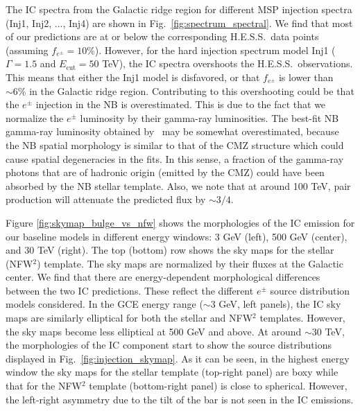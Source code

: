 \documentclass[doublespace,nopageskip]{VTthesis}
\begin{document}
The IC spectra from the Galactic ridge region for different MSP injection spectra (Inj1, Inj2, ..., Inj4) are shown in Fig.~\ref{fig:spectrum_spectral}. We find that most of our predictions are at or below the corresponding H.E.S.S.~data points (assuming $f_{e^\pm} = 10\%$). However, for the hard injection spectrum model Inj1 ($\Gamma = 1.5$ and $E_{\text{cut}}=50$ TeV), the IC spectra overshoots the H.E.S.S.~observations. This means that either the Inj1 model is disfavored, or that $f_{e^\pm}$ is lower than $\sim 6\%$ in the Galactic ridge region. Contributing to this overshooting could be that the $e^\pm$ injection in the NB is overestimated. This is due to the fact that we normalize the $e^\pm$ luminosity by their gamma-ray luminosities. The best-fit NB gamma-ray luminosity obtained by~\citet{2018NatAs...2..387M} may be somewhat overestimated, because the NB spatial morphology is similar to that of the CMZ structure which could cause spatial degeneracies in the fits. In this sense, a fraction of the gamma-ray photons that are of hadronic origin (emitted by the CMZ) could have been absorbed by the NB stellar template. Also, we note that at around 100 TeV, pair production will attenuate the predicted flux by $\sim 3/4$.

Figure \ref{fig:skymap_bulge_vs_nfw} shows the morphologies of the IC emission for our baseline models in different energy windows: 3 GeV (left), 500 GeV (center), and 30 TeV (right). The top (bottom) row shows the sky maps for the stellar (NFW$^2$) template. The sky maps are normalized by their fluxes at the Galactic center. We find that there are energy-dependent morphological differences between the two IC predictions. These reflect the different $e^\pm$ source distribution models considered. In the GCE energy range ($\sim 3$ GeV, left panels), the IC sky maps are similarly elliptical for both the stellar and NFW$^2$ templates. However, the sky maps become less elliptical at 500 GeV and above. At around $\sim 30$ TeV, the morphologies of the IC component start to show the source distributions displayed in Fig.~\ref{fig:injection_skymap}. As it can be seen, in the highest energy window the sky maps for the stellar template (top-right panel) are boxy while that for the NFW$^2$ template (bottom-right panel) is close to spherical. However, the left-right asymmetry due to the tilt of the bar is not seen in the IC emissions.
\end{document}
